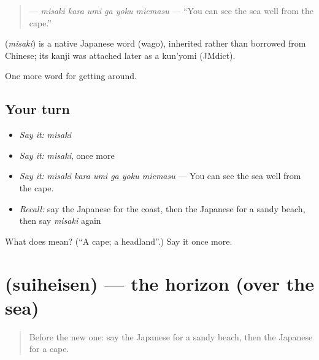 \begin{quote}
\textbf{   } — \emph{misaki kara umi ga yoku miemasu} — \textquotedblleft{}You can see the sea well from the cape.\textquotedblright{}
\end{quote}

\begin{cousinweb}
\textbf{} (\emph{misaki}) is a native Japanese word (wago), inherited rather than borrowed from Chinese; its kanji was attached later as a kun'yomi (JMdict).
\end{cousinweb}

\begin{grammarlens}[title={What you've built}]
One more word for getting around.
\end{grammarlens}

\subsection*{Your turn}
\begin{itemize}
\raggedright
  \item \emph{Say it:} \emph{misaki}
  \item \emph{Say it:} \emph{misaki}, once more
  \item \emph{Say it:} \emph{misaki kara umi ga yoku miemasu} — You can see the sea well from the cape.
  \item \emph{Recall:} say the Japanese for the coast, then the Japanese for a sandy beach, then say \emph{misaki} again
\end{itemize}

\begin{tcolorbox}[breakable,colback=teal!4,colframe=teal!35!black,title={Before you move on}]
What does  mean? (\textquotedblleft{}A cape; a headland\textquotedblright{}.) Say it once more.
\end{tcolorbox}
\section[\texorpdfstring{\ja{すいへいせん} (suiheisen)}{すいへいせん (suiheisen)}]{ (suiheisen) — the horizon (over the sea)}

\label{lesson:JA-C382-suiheisen}



\begin{quote}
Before the new one: say the Japanese for a sandy beach, then the Japanese for a cape.
\end{quote}

